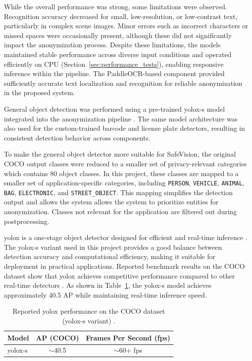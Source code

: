 While the overall performance was strong, some limitations were observed. Recognition accuracy decreased for small, low-resolution, or low-contrast text, particularly in complex scene images. Minor errors such as incorrect characters or missed spaces were occasionally present, although these did not significantly impact the \gls{anonymization} process. Despite these limitations, the models maintained stable performance across diverse input conditions and operated efficiently on CPU (Section~\ref{sec:performance_tests}), enabling responsive \gls{inference} within the pipeline. The PaddleOCR-based component provided sufficiently accurate text localization and recognition for reliable \gls{anonymization} in the proposed system.



General \gls{object detection} was performed using a pre-trained \gls{yolox-s} model integrated into the \gls{anonymization} pipeline \cite{yolox}. The same model architecture was also used for the custom-trained barcode and license plate detectors, resulting in consistent detection behavior across components.

To make the general object detector more suitable for \gls{SafeVision}, the original COCO output classes were reduced to a smaller set of privacy-relevant categories which contains 80 object classes. In this project, these classes are mapped to a smaller set of application-specific categories, including \texttt{PERSON}, \texttt{VEHICLE}, \texttt{ANIMAL}, \texttt{BAG}, \texttt{ELECTRONIC}, and \texttt{STREET\_OBJECT}. This mapping simplifies the detection output and allows the system allows the system to prioritize entities for \gls{anonymization}. Classes not relevant for the application are filtered out during postprocessing.

\gls{yolox} is a one-stage object detector designed for efficient and real-time \gls{inference} \cite{yolox}. The \gls{yolox-s} variant used in this project provides a good balance between detection accuracy and computational efficiency, making it suitable for deployment in practical applications. Reported benchmark results on the COCO dataset show that \gls{yolox} achieves competitive performance compared to other real-time detectors \cite{yolox}. As shown in Table~\ref{tab:yolox_benchmark}, the \gls{yolox-s} model achieves approximately 40.5 AP while maintaining real-time \gls{inference} speed.

\begin{table}[H]
\centering
\begin{tabular}{lcc}
\toprule
Model & AP (COCO) & Frames Per Second (\acrshort{fps}) \\
\midrule
\gls{yolox-s} & $\sim$40.5 & $\sim$60+ \acrshort{fps} \\
\bottomrule
\end{tabular}
\caption{Reported \gls{yolox} performance on the COCO dataset (\gls{yolox-s} variant) \cite{yolox}.}
\label{tab:yolox_benchmark}
\end{table}

